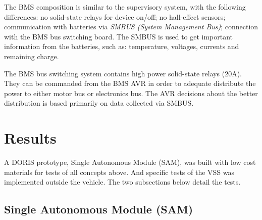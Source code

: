 \documentclass{ifacconf}
\begin{document}
The BMS composition is similar to the supervisory system, with the following
differences: no solid-state relays for device on/off; no hall-effect sensors;
communication with batteries via \emph{SMBUS (System Management Bus)};
connection with the BMS bus switching board. The SMBUS is used to get important
information from the batteries, such as: temperature, voltages, currents and
remaining charge. 

The BMS bus switching system contains high power solid-state relays (20A). They
can be commanded from the BMS AVR in order to adequate distribute the power to
either motor bus or electronics bus. The AVR decisions about the better
distribution is based primarily on data collected via SMBUS.


\section{Results}\label{sec:results}
A DORIS prototype, Single Autonomous Module (SAM), was built
with low cost materials for tests of all concepts above. And specific tests of
the VSS was implemented outside the vehicle. The two subsections below detail
the tests.

\subsection{Single Autonomous Module (SAM)}
\end{document}

